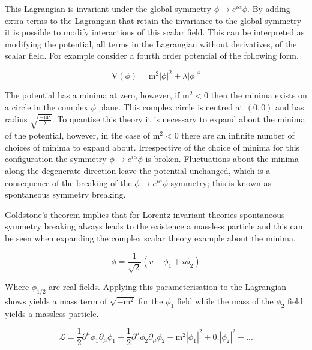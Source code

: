 This Lagrangian is invariant under the global symmetry $\phi \rightarrow e^{i\alpha} \phi$.  By adding extra terms to the Lagrangian that retain the invariance to the global symmetry it is possible to modify interactions of this scalar field.  This can be interpreted as modifying the potential, all terms in the Lagrangian without derivatives, of the scalar field.  For example consider a fourth order potential of the following form.

\begin{equation}
\text{V}(\phi) = \text{m}^{2}|\phi|^{2} + \lambda |\phi|^{4}
\end{equation}

The potential has a minima at zero, however, if $\text{m}^{2} < 0$ then the minima exists on a circle in the complex $\phi$ plane.  This complex circle is centred at $(0,0)$ and has radius $\sqrt{\frac{-\text{m}^{2}}{\lambda}}$.  To quantise this theory it is necessary to expand about the minima of the potential, however, in the case of $\text{m}^{2} < 0$ there are an infinite number of choices of minima to expand about.  Irrespective of the choice of minima for this configuration the symmetry $\phi \rightarrow e^{i\alpha} \phi$ is broken.  Fluctuations about the minima along the degenerate direction leave the potential unchanged, which is a consequence of the breaking of the $\phi \rightarrow e^{i\alpha} \phi$ symmetry; this is known as spontaneous symmetry breaking.

Goldstone's theorem implies that for Lorentz-invariant theories spontaneous symmetry breaking always leads to the existence a massless particle and this can be seen when expanding the complex scalar theory example about the minima.

\begin{equation}
\phi = \frac{1}{\sqrt{2}}(v + \phi_{1} + i \phi_{2})
\end{equation}

Where $\phi_{1/2}$ are real fields.  Applying this parameterisation to the Lagrangian shows yields a mass term of $\sqrt{-\text{m}^{2}}$ for the $\phi_{1}$ field while the mass of the $\phi_{2}$ field yields a massless particle.  

\begin{equation}
\mathcal{L} = \frac{1}{2}\partial^{\mu} \phi_{1} \partial_{\mu} \phi_{1} + \frac{1}{2}\partial^{\mu} \phi_{2} \partial_{\mu} \phi_{2} - \text{m}^{2}|\phi_{1}|^{2} + 0.|\phi_{2}|^{2} + ...
\end{equation}

